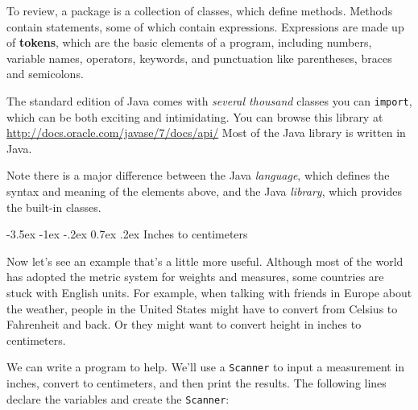 \documentclass[12pt]{book}
\makeatletter
\theoremstyle{exercise}
\newcommand{\java}[1]{\verb"#1"}
\renewcommand{\section}{\@startsection{section}{1}{\z@}%
    {-3.5ex \@plus -1ex \@minus -.2ex}%
    {0.7ex \@plus.2ex}%
    {\normalfont\Large\bfseries}}
\newcommand{\java}[1]{\lstinline{#1}} %
\makeatother
\begin{document}
To review, a package is a collection of classes, which define methods.
Methods contain statements, some of which contain expressions.
Expressions are made up of {\bf tokens}, which are the basic elements of a program, including numbers, variable names, operators, keywords, and punctuation like parentheses, braces and semicolons.

The standard edition of Java comes with {\em several thousand} classes you can \java{import}, which can be both exciting and intimidating.
You can browse this library at \url{http://docs.oracle.com/javase/7/docs/api/}
Most of the Java library is written in Java.


Note there is a major difference between the Java {\em language}, which defines the syntax and meaning of the elements above, and the Java {\em library}, which provides the built-in classes.


\section{Inches to centimeters}

Now let's see an example that's a little more useful.
Although most of the world has adopted the metric system for weights and measures, some countries are stuck with English units.
For example, when talking with friends in Europe about the weather, people in the United States might have to convert from Celsius to Fahrenheit and back.
Or they might want to convert height in inches to centimeters.


We can write a program to help.
We'll use a \java{Scanner} to input a measurement in inches, convert to centimeters, and then print the results.
The following lines declare the variables and create the \java{Scanner}:
\end{document}
